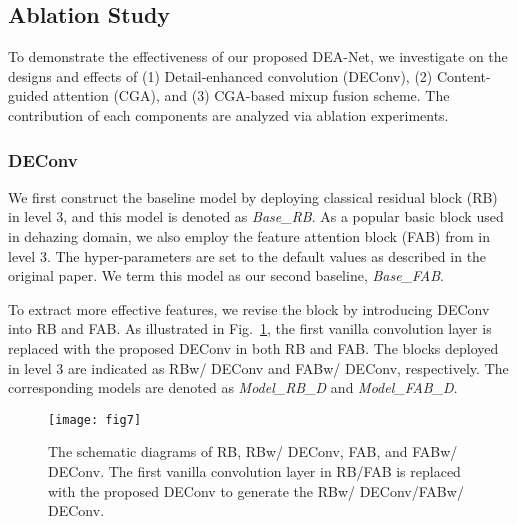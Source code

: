 \documentclass[lettersize,journal]{IEEEtran}
\begin{document}
\subsection{Ablation Study}
To demonstrate the effectiveness of our proposed DEA-Net, we investigate on the designs and effects of (1) Detail-enhanced convolution (DEConv), (2) Content-guided attention (CGA), and (3) CGA-based mixup fusion scheme.
The contribution of each components are analyzed via ablation experiments.

\subsubsection[1]{DEConv}
\label{subsec: DEConv}
We first construct the baseline model by deploying classical residual block (RB) \cite{he2016deep} in level 3, and this model is denoted as \textit{Base\_RB}. 
As a popular basic block used in dehazing domain, we also employ the feature attention block (FAB) from \cite{qin2020AAAI} in level 3.
The hyper-parameters are set to the default values as described in the original paper.
We term this model as our second baseline, \textit{Base\_FAB}.

To extract more effective features, we revise the block by introducing DEConv into RB and FAB.
As illustrated in Fig.~\ref{fig:figX}, the first vanilla convolution layer is replaced with the proposed DEConv in both RB and FAB.
The blocks deployed in level 3 are indicated as RB{\tiny w/ DEConv} and FAB{\tiny w/ DEConv}, respectively.
The corresponding models are denoted as \textit{Model\_RB\_D} and \textit{Model\_FAB\_D}.

\begin{figure}[h]
	\centering
	\texttt{[image: fig7]}
	\caption{The schematic diagrams of RB, RB{\tiny w/ DEConv}, FAB, and FAB{\tiny w/ DEConv}. The first vanilla convolution layer in RB/FAB is replaced with the proposed DEConv to generate the RB{\tiny w/ DEConv}/FAB{\tiny w/ DEConv}.}
	\label{fig:figX}
\end{figure}
\end{document}
